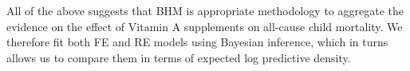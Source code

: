 \documentclass[12pt]{article}
\begin{document}
All of the above suggests that BHM is appropriate methodology to aggregate the evidence on the effect of Vitamin A supplements on all-cause child mortality. We therefore fit both FE and RE models using Bayesian inference, which in turns allows us to compare them in terms of expected log predictive density.







\end{document}
